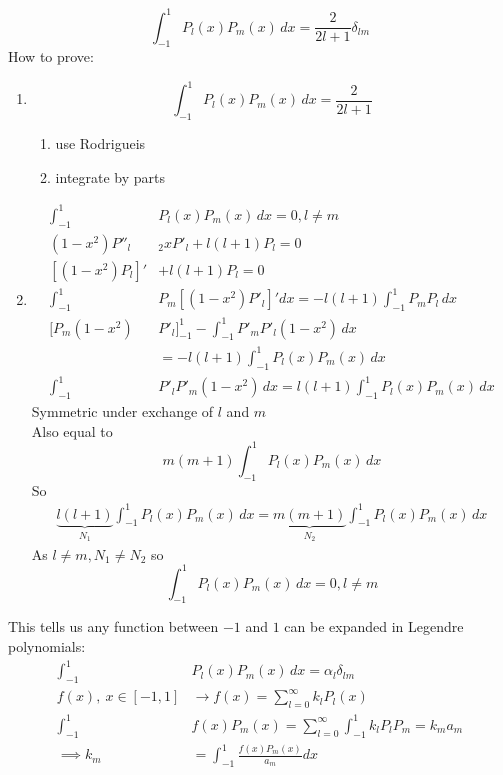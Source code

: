 \documentclass[Maths.tex]{subfiles}
\begin{document}
\begin{equation}
    \int_{-1}^1 P_l(x)P_m(x)\,dx = \frac{2}{2l+1}\delta_{lm}
\end{equation}
How to prove:
\begin{enumerate}
    \item
    \begin{equation}
        \int_{-1}^1 P_l(x)P_m(x)\,dx = \frac{2}{2l+1}
    \end{equation}
    \begin{enumerate}
        \item use Rodrigueis
        \item integrate by parts
    \end{enumerate}
    \item
    \begin{align}
        \int_{-1}^1 &P_l(x)P_m(x)\,dx = 0, l\neq m \\
        (1-x^2)P''_l &_ 2xP'_l + l(l+1)P_l = 0 \\
        [(1-x^2)P_l]' &+ l(l+1)P_l = 0 \\
        \int_{-1}^1 &P_m[(1-x^2)P'_l]'dx = -l(l+1)\int_{-1}^1 P_mP_l\,dx \\
        [P_m(1-x^2)&P'_l]_{-1}^1 - \int_{-1}^1 P'_mP'_l(1-x^2)\,dx \\
        &= -l(l+1)\int_{-1}^1 P_l(x)P_m(x)\,dx \\
        \int_{-1}^1 &P'_lP'_m(1-x^2)\,dx = l(l+1)\int_{-1}^1 P_l(x)P_m(x)\,dx
    \end{align}
    Symmetric under exchange of $l$ and $m$ \\
    Also equal to
    \begin{equation}
        m(m+1)\int_{-1}^1 P_l(x)P_m(x)\,dx
    \end{equation}
    So
    \begin{align}
        \underbrace{l(l+1)}_{N_1}\int_{-1}^1 P_l(x)P_m(x)\,dx = \underbrace{m(m+1)}_{N_2}\int_{-1}^1 P_l(x)P_m(x)\,dx
    \end{align}
    As $l\neq m, N_1 \neq N_2$ so
    \begin{equation}
        \int_{-1}^1 P_l(x)P_m(x)\,dx = 0, l\neq m
    \end{equation}
\end{enumerate}
This tells us any function between $-1$ and $1$ can be expanded in Legendre polynomials:
\begin{align}
    \int_{-1}^1 &P_l(x)P_m(x)\,dx = \alpha_l \delta_{lm} \\
    f(x),~ x\in [-1,1] &\to f(x) = \sum_{l=0}^\infty k_lP_l(x) \\
    \int_{-1}^1 &f(x)P_m(x) = \sum_{l=0}^\infty \int_{-1}^1 k_lP_lP_m = k_ma_m \\
    \implies k_m &= \int_{-1}^1 \frac{f(x)P_m(x)}{a_m}dx
\end{align}
\end{document}

